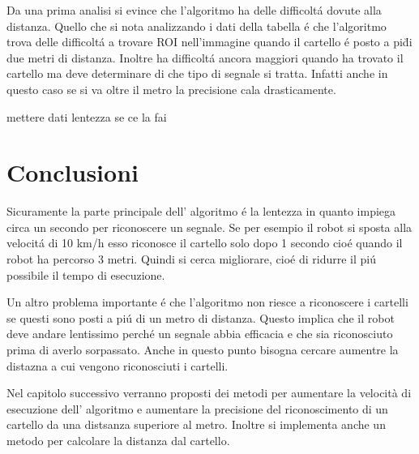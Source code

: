     Da una prima analisi si evince che l'algoritmo ha delle difficolt\'a dovute alla distanza. Quello che si nota analizzando i dati della tabella \'e che l'algoritmo trova delle difficolt\'a a trovare ROI nell'immagine quando il cartello \'e posto a pi\u di due metri di distanza. Inoltre ha difficolt\'a ancora maggiori quando ha trovato il cartello ma deve determinare di che tipo di segnale si tratta. Infatti anche in questo caso se si va oltre il metro la precisione cala drasticamente.

    mettere dati lentezza se ce la fai

\section{Conclusioni}

	Sicuramente la parte principale  dell' algoritmo \'e la lentezza in quanto impiega circa un secondo per riconoscere un segnale. Se per esempio il robot si sposta alla velocit\'a di 10 km/h esso riconosce il cartello solo dopo 1 secondo cio\'e quando il robot ha percorso 3 metri. Quindi si cerca migliorare, cio\'e di ridurre il pi\'u possibile il tempo di esecuzione.

	Un altro problema importante \'e che l'algoritmo non riesce a riconoscere i cartelli se questi sono posti a pi\'u di un metro di distanza. Questo implica che il robot deve andare lentissimo perch\'e un segnale abbia efficacia e che sia riconosciuto prima di averlo sorpassato. Anche in questo punto bisogna cercare aumentre la distazna a cui vengono riconosciuti i cartelli.
	
	Nel capitolo successivo verranno proposti dei metodi per aumentare la velocità di esecuzione dell' algoritmo e aumentare la precisione del riconoscimento di un cartello da una distsanza superiore al metro. Inoltre si implementa anche un metodo per calcolare la distanza dal cartello.

	



